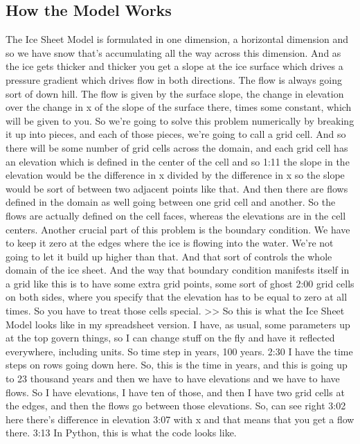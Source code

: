 {\subsection{How the Model Works}\index{}
The Ice Sheet Model is formulated in one dimension, a horizontal dimension and so we have snow that's accumulating all the way across this dimension. And as the ice gets thicker and thicker you get a slope at the ice surface which drives a pressure gradient which drives flow in both directions. The flow is always going sort of down hill. The flow is given by the surface slope, the change in elevation over the change in x of the slope of the surface there, times some constant, which will be given to you. So we're going to solve this problem numerically by breaking it up into pieces, and each of those pieces, we're going to call a grid cell. And so there will be some number of grid cells across the domain, and each grid cell has an elevation which is defined in the center of the cell and so 
1:11
the slope in the elevation would be the difference in x divided by the difference in x so the slope would be sort of between two adjacent points like that. And then there are flows defined in the domain as well going between one grid cell and another. So the flows are actually defined on the cell faces, whereas the elevations are in the cell centers. Another crucial part of this problem is the boundary condition. We have to keep it zero at the edges where the ice is flowing into the water. We're not going to let it build up higher than that. And that sort of controls the whole domain of the ice sheet. And the way that boundary condition manifests itself in a grid like this is to have some extra grid points, some sort of ghost 
2:00
grid cells on both sides, where you specify that the elevation has to be equal to zero at all times. So you have to treat those cells special. >> So this is what the Ice Sheet Model looks like in my spreadsheet version. I have, as usual, some parameters up at the top govern things, so I can change stuff on the fly and have it reflected everywhere, including units. So time step in years, 100 years. 
2:30
I have the time steps on rows going down here. So, this is the time in years, and this is going up to 23 thousand years and then we have to have elevations and we have to have flows. So I have elevations, I have ten of those, and then I have two grid cells at the edges, and then the flows go between those elevations. So, can see right 
3:02
here there's difference in elevation 
3:07
with x and that means that you get a flow there. 
3:13
In Python, this is what the code looks like. 
}
